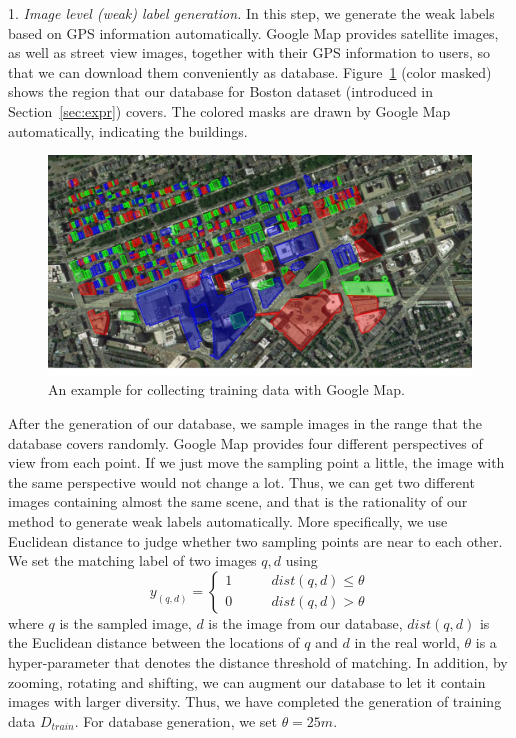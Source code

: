 1.	\emph{Image level (weak) label generation.} 
In this step, we generate the weak labels based on GPS information automatically. 
Google Map provides satellite images, as well as street view images, together with their GPS information to users, so that we can download them conveniently as database. 
Figure~\ref{fig:dbregion} (color masked) shows the region that our database for Boston dataset (introduced in Section~\ref{sec:expr}) covers. 
The colored masks are drawn by Google Map automatically, indicating the buildings. 
\begin{figure}[t]
\includegraphics[width=0.7\linewidth]{img/db_region}
\caption{An example for collecting training data with Google Map.}
\label{fig:dbregion}
\end{figure}
After the generation of our database, we sample images in the range that the database covers randomly. 
Google Map provides four different perspectives of view from each point. 
If we just move the sampling point a little, the image with the same perspective would not change a lot. 
Thus, we can get two different images containing almost the same scene, and that is the rationality of our method to generate weak labels automatically.
More specifically, we use Euclidean distance to judge whether two sampling points are near to each other. 
We set the matching label of two images $q, d$ using 
\begin{equation}
\label{eq:weaklabel}
y_{(q, d)} = \left\{
\begin{aligned}
1 \qquad & dist(q,d) \leq \theta \\
0 \qquad & dist(q,d) > \theta
\end{aligned}
\right.
\end{equation}
where $q$ is the sampled image, $d$ is the image from our database, $dist(q,d)$ is the Euclidean distance between the locations of $q$ and $d$ in the real world, $\theta$ is a hyper-parameter that denotes the distance threshold of matching. 
In addition, by zooming, rotating and shifting, we can augment our database to let it contain images with larger diversity. 
Thus, we have completed the generation of training data $D_{train}$.
For database generation, we set $\theta = 25m$.\\[-0.25cm]

